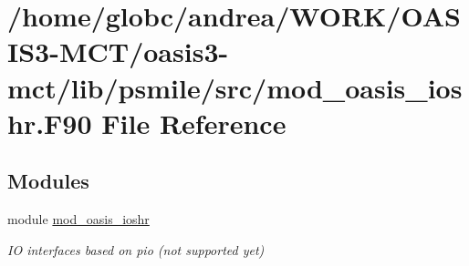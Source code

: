 \hypertarget{mod__oasis__ioshr_8_f90}{}\section{/home/globc/andrea/\+W\+O\+R\+K/\+O\+A\+S\+I\+S3-\/\+M\+C\+T/oasis3-\/mct/lib/psmile/src/mod\+\_\+oasis\+\_\+ioshr.F90 File Reference}
\label{mod__oasis__ioshr_8_f90}
\subsection*{Modules}
\begin{DoxyCompactItemize}
\item 
module \hyperlink{namespacemod__oasis__ioshr}{mod\+\_\+oasis\+\_\+ioshr}
\begin{DoxyCompactList}\small\item\em IO interfaces based on pio (not supported yet) \end{DoxyCompactList}\end{DoxyCompactItemize}
